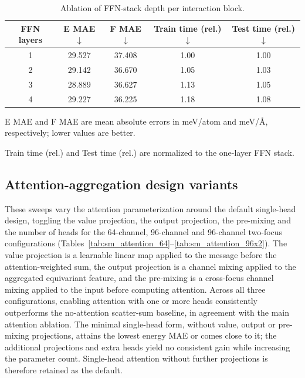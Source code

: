 \begin{table}[ht]
    \PaperTableStyle
    \begin{threeparttable}
        \caption{Ablation of FFN-stack depth per interaction block.}
        \label{tab:sm_ffn_stack}
        \begin{tabular*}{\linewidth}{@{\extracolsep{\fill}}ccccc@{}}
        \toprule
        \textbf{FFN layers}              &
        \textbf{E MAE}$\downarrow$\tnote{a} &
        \textbf{F MAE}$\downarrow$\tnote{a} &
        \textbf{Train time (rel.)}$\downarrow$\tnote{b} &
        \textbf{Test time (rel.)}$\downarrow$\tnote{b}                  \\
        \midrule
        1                                & 29.527 & 37.408 & 1.00 & 1.00 \\
        2                                & 29.142 & 36.670 & 1.05 & 1.03 \\
        3                                & 28.889 & 36.627 & 1.13 & 1.05 \\
        4                                & 29.227 & 36.225 & 1.18 & 1.08 \\
        \bottomrule
        \end{tabular*}
        \begin{tablenotes}[flushleft]
            \PaperTableNotesStyle
            \item[a] E MAE and F MAE are mean absolute errors in meV/atom and meV/\AA, respectively; lower values are better.
            \item[b] Train time (rel.) and Test time (rel.) are normalized to the one-layer FFN stack.
        \end{tablenotes}
    \end{threeparttable}
\end{table}

\FloatBarrier
\subsection{Attention-aggregation design variants}

These sweeps vary the attention parameterization around the default single-head design, toggling the value projection, the output projection, the pre-mixing and the number of heads for the 64-channel, 96-channel and 96-channel two-focus configurations (Tables~\ref{tab:sm_attention_64}--\ref{tab:sm_attention_96x2}).
The value projection is a learnable linear map applied to the message before the attention-weighted sum, the output projection is a channel mixing applied to the aggregated equivariant feature, and the pre-mixing is a cross-focus channel mixing applied to the input before computing attention.
Across all three configurations, enabling attention with one or more heads consistently outperforms the no-attention scatter-sum baseline, in agreement with the main attention ablation.
The minimal single-head form, without value, output or pre-mixing projections, attains the lowest energy MAE or comes close to it; the additional projections and extra heads yield no consistent gain while increasing the parameter count.
Single-head attention without further projections is therefore retained as the default.

